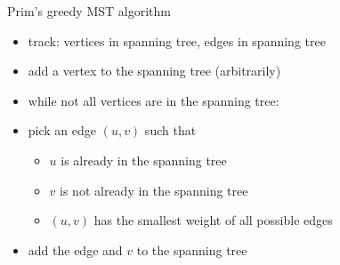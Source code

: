\begin{frame}{Prim's greedy MST algorithm}
    \begin{itemize}
    \item track: vertices in spanning tree, edges in spanning tree
    \item add a vertex to the spanning tree (arbitrarily)
    \vspace{.5cm}
    \item while not all vertices are in the spanning tree: 
    \item pick an edge $(u, v)$ such that
        \begin{itemize}
        \item $u$ is already in the spanning tree
        \item $v$ is not already in the spanning tree
        \item $(u,v)$ has the smallest weight of all possible edges
        \end{itemize}
    \item add the edge and $v$ to the spanning tree
    \end{itemize}
\end{frame}
